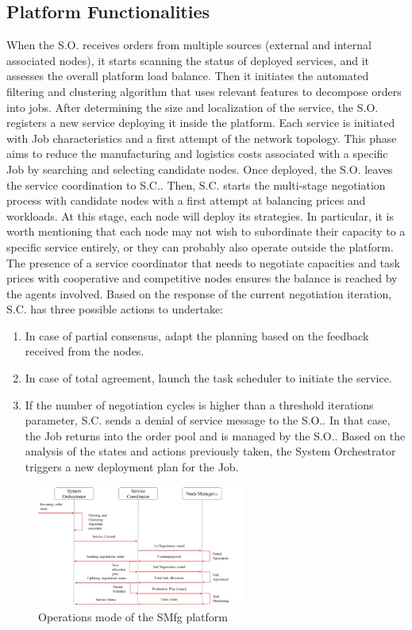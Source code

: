 \subsection{Platform Functionalities}
When the S.O. receives orders from multiple sources (external and internal associated nodes), it starts scanning the status of deployed services, and it assesses the overall platform load balance. Then it initiates the automated filtering and clustering algorithm that uses relevant features to decompose orders into jobs. After determining the size and localization of the service, the S.O. registers a new service deploying it inside the platform. Each service is initiated with Job characteristics and a first attempt of the network topology. This phase aims to reduce the manufacturing and logistics costs associated with a specific Job by searching and selecting candidate nodes. Once deployed, the S.O. leaves the service coordination to S.C.. Then, S.C. starts the multi-stage negotiation process with candidate nodes with a first attempt at balancing prices and workloads. At this stage, each node will deploy its strategies. In particular, it is worth mentioning that each node may not wish to subordinate their capacity to a specific service entirely, or they can probably also operate outside the platform. The presence of a service coordinator that needs to negotiate capacities and task prices with cooperative and competitive nodes ensures the balance is reached by the agents involved. Based on the response of the current negotiation iteration, S.C. has three possible actions to undertake:
\begin{enumerate}
    \item In case of partial consensus, adapt the planning based on the feedback received from the nodes.
    \item In case of total agreement, launch the task scheduler to initiate the service.
    \item If the number of negotiation cycles is higher than a threshold iterations parameter, S.C. sends a denial of service message to the S.O.. In that case, the Job returns into the order pool and is managed by the S.O.. Based on the analysis of the states and actions previously taken, the System Orchestrator triggers a new deployment plan for the Job.
\end{enumerate}

\begin{figure}[h]
    \centering
    \includegraphics[height=4cm, keepaspectratio]{images/operations-mode-smfg}
    \caption{Operations mode of the SMfg platform}
    \label{fig:operations-mode-smfg}
\end{figure}

